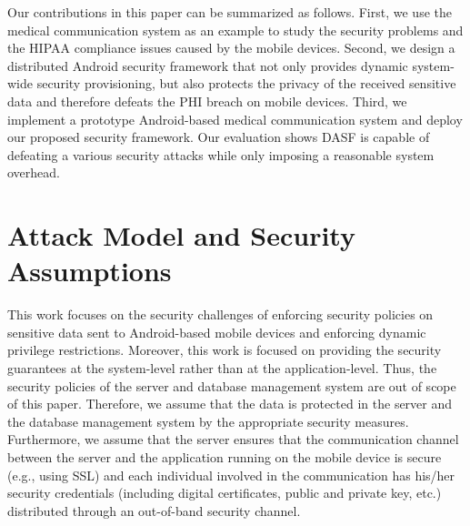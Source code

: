\begin{comment}
Therefore, the contributions that this paper provides are as
follows.  First, this paper provides a security policy
for dynamic system-wide privilege restrictions to be
enforced on applications.  Second, this paper also provides
a security policy that can be enforced on sensitive data.
The aforementioned security policies can either be utilized
by a server communicating with the mobile device or programatically
by a developer who is creating an application.
\end{comment}
Our contributions in this paper can be summarized as follows. First,
we use the medical communication system as an example to study the
security problems and the HIPAA compliance issues caused by the
mobile devices.  Second,
we design a distributed Android security framework that not only
provides dynamic system-wide security provisioning, but also protects
the privacy of the received sensitive data and therefore defeats
the PHI breach on mobile devices.  Third, we implement
a prototype Android-based medical communication system and deploy our
proposed security framework.  Our evaluation shows DASF is capable of
defeating a various security attacks while only imposing a reasonable
system overhead.


\section{Attack Model and Security Assumptions}

This work focuses on the security challenges of enforcing 
security policies on sensitive data sent to Android-based 
mobile devices and enforcing dynamic privilege restrictions. 
Moreover, this work is focused on providing the security 
guarantees at the system-level rather than at the application-level.
Thus, the security policies of the server and database 
management system are out of scope of this paper. Therefore, 
we assume that the data is protected in the server and the 
database management system by the appropriate security measures.
Furthermore, we assume that the server ensures that the 
communication channel between the server and the application 
running on the mobile device is secure (e.g., using SSL) and 
each individual involved in the communication has his/her 
security credentials (including digital certificates, public and 
private key, etc.) distributed through an out-of-band security 
channel. 

